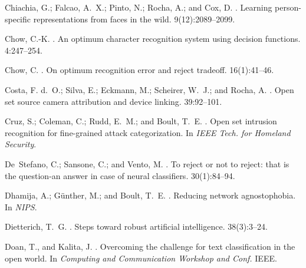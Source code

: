 \documentclass[letterpaper]{article}
\begin{document}
\begin{thebibliography}{}
Chiachia, G.; Falcao, A.~X.; Pinto, N.; Rocha, A.; and Cox, D.
.
\newblock Learning person-specific representations from faces in the wild.
 9(12):2089--2099.

Chow, C.-K.
.
\newblock An optimum character recognition system using decision functions.
 4:247--254.

Chow, C.
.
\newblock On optimum recognition error and reject tradeoff.
 16(1):41--46.

Costa, F. d.~O.; Silva, E.; Eckmann, M.; Scheirer, W.~J.; and Rocha, A.
.
\newblock Open set source camera attribution and device linking.
 39:92--101.

Cruz, S.; Coleman, C.; Rudd, E.~M.; and Boult, T.~E.
.
\newblock Open set intrusion recognition for fine-grained attack
  categorization.
\newblock In {\em {IEEE} Tech. for {Homeland} {Security}}.

De~Stefano, C.; Sansone, C.; and Vento, M.
.
\newblock To reject or not to reject: that is the question-an answer in case of
  neural classifiers.
 30(1):84--94.

Dhamija, A.; G\"unther, M.; and Boult, T.~E.
.
\newblock Reducing network agnostophobia.
\newblock In {\em NIPS}.

Dietterich, T.~G.
.
\newblock Steps toward robust artificial intelligence.
 38(3):3--24.

Doan, T., and Kalita, J.
.
\newblock Overcoming the challenge for text classification in the open world.
\newblock In {\em Computing and {Communication} {Workshop} and {Conf.}}
\newblock IEEE.


\end{thebibliography}
\end{document}
